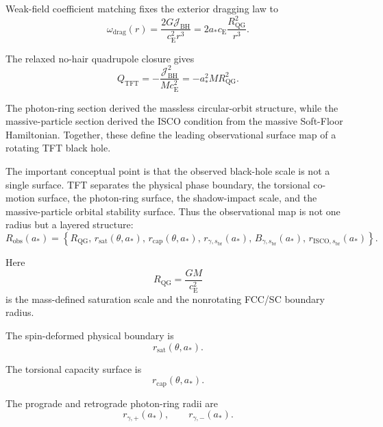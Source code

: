 Weak-field coefficient matching fixes the exterior dragging law to
\begin{equation}
    \omega_{\mathrm{drag}}(r) = \frac{2G\mathcal{J}_{\mathrm{BH}}}{c_{\mathrm{E}}^2r^3} = 2a_\ast c_{\mathrm{E}}\frac{R_{\mathrm{QG}}^2}{r^3}.
\end{equation}

The relaxed no-hair quadrupole closure gives
\begin{equation}
    Q_{\mathrm{TFT}} = -\frac{\mathcal{J}_{\mathrm{BH}}^2}{M c_{\mathrm{E}}^2} = -a_\ast^2M R_{\mathrm{QG}}^2.
\end{equation}

The photon-ring section derived the massless circular-orbit structure, while the massive-particle section derived the ISCO condition from the massive Soft-Floor Hamiltonian. Together, these define the leading observational surface map of a rotating TFT black hole.

The important conceptual point is that the observed black-hole scale is not a single surface. TFT separates the physical phase boundary, the torsional co-motion surface, the photon-ring surface, the shadow-impact scale, and the massive-particle orbital stability surface. Thus the observational map is not one radius but a layered structure:
\begin{equation}
    R_{\mathrm{obs}}(a_\ast) = \left\{ R_{\mathrm{QG}}, \, r_{\mathrm{sat}}(\theta,a_\ast), \, r_{\mathrm{cap}}(\theta,a_\ast), \, r_{\gamma,s_{\mathrm{br}}}(a_\ast), \, B_{\gamma,s_{\mathrm{br}}}(a_\ast), \, r_{\mathrm{ISCO},s_{\mathrm{br}}}(a_\ast) \right\}.
\end{equation}

Here
\begin{equation}
    R_{\mathrm{QG}} = \frac{GM}{c_{\mathrm{E}}^2}
\end{equation}
is the mass-defined saturation scale and the nonrotating FCC/SC boundary radius.

The spin-deformed physical boundary is
\begin{equation}
    r_{\mathrm{sat}}(\theta,a_\ast).
\end{equation}

The torsional capacity surface is
\begin{equation}
    r_{\mathrm{cap}}(\theta,a_\ast).
\end{equation}

The prograde and retrograde photon-ring radii are
\begin{equation}
    r_{\gamma,+}(a_\ast), \qquad r_{\gamma,-}(a_\ast).
\end{equation}

